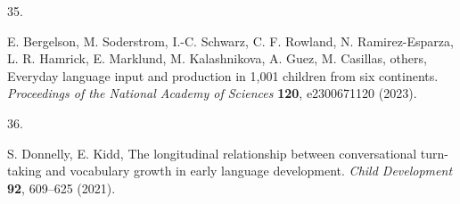 \documentclass[
  man,floatsintext]{apa6}
\newlength{\cslhangindent}
\newlength{\csllabelwidth}
\newlength{\cslentryspacingunit} %
\newenvironment{CSLReferences}[2] %
 {%
  \setlength{\parindent}{0pt}
  \ifodd #1
  \let\oldpar\par
  \def\par{\hangindent=\cslhangindent\oldpar}
  \fi
  \setlength{\parskip}{#2\cslentryspacingunit}
 }%
 {}
\newcommand{\CSLLeftMargin}[1]{\parbox[t]{\csllabelwidth}{#1}}
\newcommand{\CSLRightInline}[1]{\parbox[t]{\linewidth - \csllabelwidth}{#1}\break}
\begin{document}
\begin{CSLReferences}{0}{0}
\leavevmode{}%
\CSLLeftMargin{35. }%
\CSLRightInline{E. Bergelson, M. Soderstrom, I.-C. Schwarz, C. F. Rowland, N. Ramirez-Esparza, L. R. Hamrick, E. Marklund, M. Kalashnikova, A. Guez, M. Casillas, others, Everyday language input and production in 1,001 children from six continents. \emph{Proceedings of the National Academy of Sciences} \textbf{120}, e2300671120 (2023).}

\leavevmode{}%
\CSLLeftMargin{36. }%
\CSLRightInline{S. Donnelly, E. Kidd, The longitudinal relationship between conversational turn-taking and vocabulary growth in early language development. \emph{Child Development} \textbf{92}, 609--625 (2021).}

\end{CSLReferences}
\end{document}
